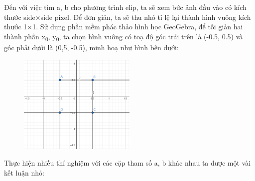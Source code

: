 \documentclass[]{article}
\begin{document}
Đến với việc tìm a, b cho phương trình elip, ta sẽ xem bức ảnh đầu vào có kích thước side$\times$side pixel. Để đơn giản, ta sẽ thu nhỏ tỉ lệ lại thành hình vuông kích thước 1$\times$1. Sử dụng phần mềm phác thảo hình học GeoGebra, để tối giản hai thành phần x\textsubscript 0, y\textsubscript 0, ta chọn hình vuông có toạ độ góc trái trên là (-0.5, 0.5) và góc phải dưới là (0,5, -0.5), minh hoạ như hình bên dưới:
\begin{figure}[!ht]
  \includegraphics[width = 0.5\textwidth]{image/square_illustrator.png}
\end{figure} \par
Thực hiện nhiều thí nghiệm với các cặp tham số a, b khác nhau ta được một vài kết luận nhỏ:
\end{document}
